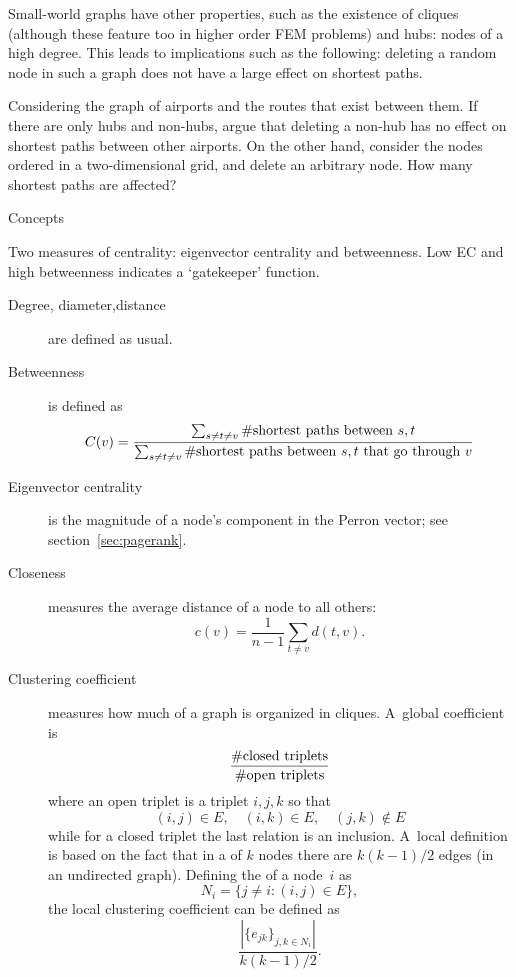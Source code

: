 Small-world graphs have other properties, such as the existence of
cliques (although these feature too in higher order \ac{FEM} problems)
and hubs: nodes of a high degree. This leads to implications such as
the following: deleting a random node in such a graph does not have a
large effect on shortest paths.

\begin{exercise}
  Considering the graph of airports and the routes that exist between
  them. If there are only hubs and non-hubs, argue that deleting a
  non-hub has no effect on shortest paths between other airports. On
  the other hand, consider the nodes ordered in a two-dimensional
  grid, and delete an arbitrary node. How many shortest paths are affected?
\end{exercise}

\begin{notready}
 {Concepts}

Two measures of centrality: eigenvector centrality and
betweenness. Low EC and high betweenness indicates a `gatekeeper'
function.

\begin{description}
  \item[Degree, diameter,distance] are defined as usual.
  \item[Betweenness]%
    is defined as 
    \[ C(v)=\frac
       {\sum_{s\not=t\not=v} \#\hbox{shortest paths between $s,t$}}
       {\sum_{s\not=t\not=v} \#\hbox{shortest paths between $s,t$ that go through $v$}}
    \]
  \item[Eigenvector centrality] is the magnitude of a node's component
    in the Perron vector; see section~\ref{sec:pagerank}.
  \item[Closeness] measures the average distance of a node to all
    others:
    \[ c(v) = \frac{1}{n-1}\sum_{t\not=v}d(t,v). \]
  \item[Clustering coefficient] measures how much of a graph is
    organized in cliques. A~global coefficient is
    \[ \frac{\#\hbox{closed triplets}}{\#\hbox{open triplets}} \]
    where an open triplet is a triplet $i,j,k$ so that
    \[ (i,j)\in E,\quad (i,k)\in E, \quad (j,k)\not\in E \]
    while for a closed triplet the last relation is an
    inclusion. A~local definition is based on the fact that in a
     of $k$ nodes there are $k(k-1)/2$ edges (in an
    undirected graph). Defining the  of a
    node~$i$ as 
    \[ N_i=\{j\not=i\colon (i,j)\in E\}, \]
    the local clustering coefficient can be defined as 
    \[ \frac{|\{e_{jk}\}_{j,k\in N_i}|}{k(k-1)/2}. \]
\end{description}
\end{notready}


